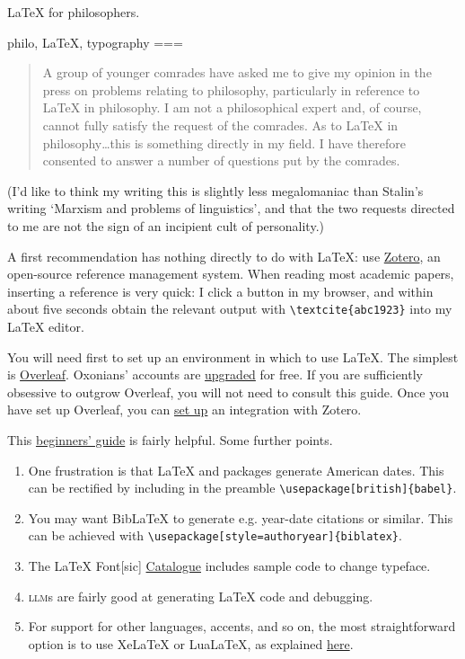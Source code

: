 LaTeX for philosophers.

philo, LaTeX, typography
===
\begin{quote}
A group of younger comrades have asked me to give my opinion in the press on problems relating to philosophy, particularly in reference to \LaTeX{} in philosophy. I am not a philosophical expert and, of course, cannot fully satisfy the request of the comrades. As to \LaTeX{} in philosophy…this is something directly in my field. I have therefore consented to answer a number of questions put by the comrades.
\end{quote}

(I’d like to think my writing this is slightly less megalomaniac than Stalin’s writing ‘Marxism and problems of linguistics’, and that the two requests directed to me are not the sign of an incipient cult of personality.)

A first recommendation has nothing directly to do with \LaTeX{}: use \href{https://zotero.org}{Zotero}, an open-source reference management system. When reading most academic papers, inserting a reference is very quick: I click a button in my browser, and within about five seconds obtain the relevant output with \texttt{\textbackslash{}textcite\{abc1923\}} into my \LaTeX{} editor.

You will need first to set up an environment in which to use \LaTeX{}. The simplest is \href{https://overleaf.com}{Overleaf}. Oxonians’ accounts are \href{https://www.overleaf.com/edu/oxford}{upgraded} for free. If you are sufficiently obsessive to outgrow Overleaf, you will not need to consult this guide. Once you have set up Overleaf, you can \href{https://www.overleaf.com/learn/how-to/How_to_link_Zotero_to_your_Overleaf_account}{set up} an integration with Zotero.

This \href{https://www.overleaf.com/learn/latex/Learn_LaTeX_in_30_minutes}{beginners' guide} is fairly helpful. Some further points.
\begin{enumerate}
\item One frustration is that \LaTeX{} and packages generate American dates. This can be rectified by including in the preamble \texttt{\textbackslash{}usepackage[british]\{babel\}}.
\item You may want BibLaTeX to generate e.g. year-date citations or similar. This can be achieved with \texttt{\textbackslash{}usepackage[style=authoryear]\{biblatex\}}.
\item The LaTeX Font[sic] \href{https://tug.org/FontCatalogue/}{Catalogue} includes sample code to change typeface.
\item \textsc{llm}s are fairly good at generating \LaTeX{} code and debugging.
\item For support for other languages, accents, and so on, the most straightforward option is to use XeLaTeX or LuaLaTeX, as explained \href{https://www.overleaf.com/blog/167-new-build-options-available-on-writelatex-compile-with-lualatex-or-latex-plus-dvipdf}{here}.
\end{enumerate}